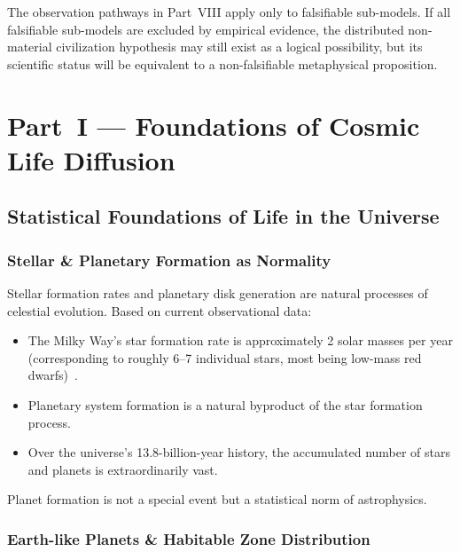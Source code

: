 \documentclass[aps,prd,twocolumn,superscriptaddress,nofootinbib]{revtex4-2}
\begin{document}
The observation pathways in Part~VIII apply only to falsifiable sub-models. If all falsifiable sub-models are excluded by empirical evidence, the distributed non-material civilization hypothesis may still exist as a logical possibility, but its scientific status will be equivalent to a non-falsifiable metaphysical proposition.


\section{Part~I --- Foundations of Cosmic Life Diffusion}\label{sec:part1}

\subsection{Statistical Foundations of Life in the Universe}\label{sec:stat-foundations}

\subsubsection{Stellar \& Planetary Formation as Normality}\label{sec:stellar-formation}

Stellar formation rates and planetary disk generation are natural processes of celestial evolution. Based on current observational data:

\begin{itemize}
  \item The Milky Way's star formation rate is approximately 2 solar masses per year (corresponding to roughly 6--7 individual stars, most being low-mass red dwarfs)~\cite{Chomiuk2011}.
  \item Planetary system formation is a natural byproduct of the star formation process.
  \item Over the universe's 13.8-billion-year history, the accumulated number of stars and planets is extraordinarily vast.
\end{itemize}

Planet formation is not a special event but a statistical norm of astrophysics.

\subsubsection{Earth-like Planets \& Habitable Zone Distribution}\label{sec:earthlike}
\end{document}
